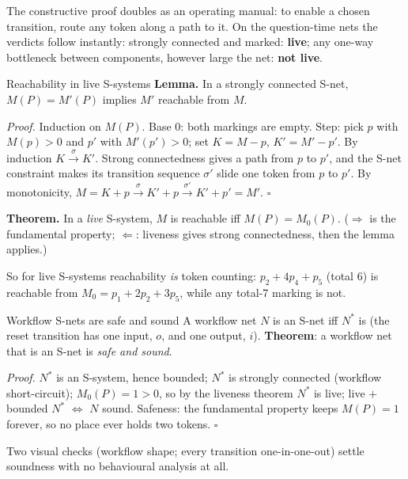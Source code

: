 The constructive proof doubles as an operating manual: to enable a chosen transition, route any token along a path to it. On the question-time nets the verdicts follow instantly: strongly connected and marked: \textbf{live}; any one-way bottleneck between components, however large the net: \textbf{not live}.

\begin{notebox}{Reachability in live S-systems}
\textbf{Lemma.} In a strongly connected S-net, $M(P) = M'(P)$ implies $M'$ reachable from $M$.
\par\smallskip
\textit{Proof.} Induction on $M(P)$. Base $0$: both markings are empty. Step: pick $p$ with $M(p) > 0$ and $p'$ with $M'(p') > 0$; set $K = M - p$, $K' = M' - p'$. By induction $K \xrightarrow{\sigma} K'$. Strong connectedness gives a path from $p$ to $p'$, and the S-net constraint makes its transition sequence $\sigma'$ slide one token from $p$ to $p'$. By monotonicity, $M = K + p \xrightarrow{\sigma} K' + p \xrightarrow{\sigma'} K' + p' = M'$. \hfill$\square$
\par\smallskip
\textbf{Theorem.} In a \emph{live} S-system, $M$ is reachable iff $M(P) = M_0(P)$. ($\Rightarrow$ is the fundamental property; $\Leftarrow$: liveness gives strong connectedness, then the lemma applies.)
\end{notebox}

So for live S-systems reachability \emph{is} token counting: $p_2 + 4p_4 + p_5$ (total 6) is reachable from $M_0 = p_1 + 2p_2 + 3p_5$, while any total-7 marking is not.

\begin{notebox}{Workflow S-nets are safe and sound}
A workflow net $N$ is an S-net iff $N^*$ is (the reset transition has one input, $o$, and one output, $i$). \textbf{Theorem}: a workflow net that is an S-net is \emph{safe and sound}.
\par\smallskip
\textit{Proof.} $N^*$ is an S-system, hence bounded; $N^*$ is strongly connected (workflow short-circuit); $M_0(P) = 1 > 0$, so by the liveness theorem $N^*$ is live; live $+$ bounded $N^*$ $\iff$ $N$ sound. Safeness: the fundamental property keeps $M(P) = 1$ forever, so no place ever holds two tokens. \hfill$\square$
\par\smallskip
Two visual checks (workflow shape; every transition one-in-one-out) settle soundness with no behavioural analysis at all.
\end{notebox}

